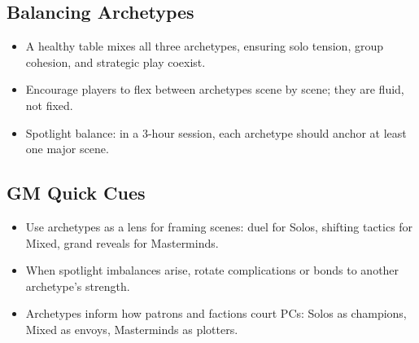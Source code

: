 \subsection{Balancing Archetypes}
\begin{itemize}
  \item A healthy table mixes all three archetypes, ensuring solo tension, group cohesion, and strategic play coexist.
  \item Encourage players to flex between archetypes scene by scene; they are fluid, not fixed.
  \item Spotlight balance: in a 3-hour session, each archetype should anchor at least one major scene.
\end{itemize}

\subsection{GM Quick Cues}
\begin{itemize}
  \item Use archetypes as a lens for framing scenes: duel for Solos, shifting tactics for Mixed, grand reveals for Masterminds.
  \item When spotlight imbalances arise, rotate complications or bonds to another archetype’s strength.
  \item Archetypes inform how patrons and factions court PCs: Solos as champions, Mixed as envoys, Masterminds as plotters.
\end{itemize}
